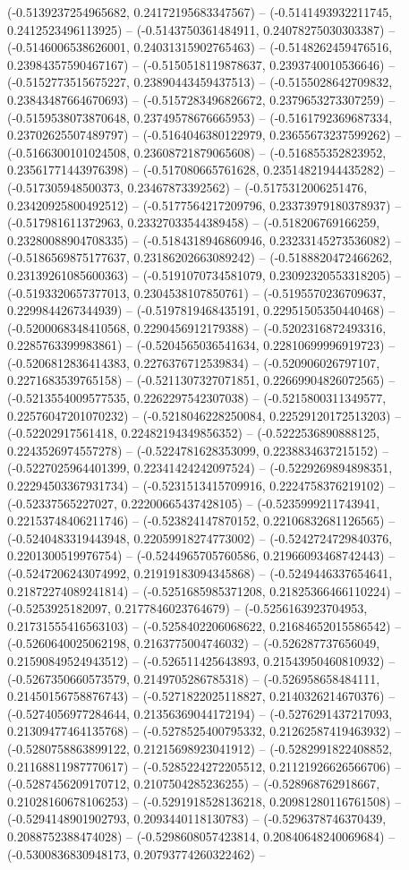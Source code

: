 (-0.5139237254965682, 0.24172195683347567) -- (-0.5141493932211745, 0.2412523496113925) -- (-0.5143750361484911, 0.24078275030303387) -- (-0.5146006538626001, 0.24031315902765463) -- (-0.5148262459476516, 0.23984357590467167) -- (-0.5150518119878637, 0.2393740010536646) -- (-0.5152773515675227, 0.23890443459437513) -- (-0.5155028642709832, 0.23843487664670693) -- (-0.5157283496826672, 0.2379653273307259) -- (-0.5159538073870648, 0.23749578676665953) -- (-0.5161792369687334, 0.23702625507489797) -- (-0.5164046380122979, 0.23655673237599262) -- (-0.5166300101024508, 0.23608721879065608) -- (-0.516855352823952, 0.23561771443976398) -- (-0.517080665761628, 0.23514821944435282) -- (-0.517305948500373, 0.23467873392562) -- (-0.5175312006251476, 0.23420925800492512) -- (-0.5177564217209796, 0.23373979180378937) -- (-0.517981611372963, 0.23327033544389458) -- (-0.518206769166259, 0.23280088904708335) -- (-0.5184318946860946, 0.23233145273536082) -- (-0.5186569875177637, 0.23186202663089242) -- (-0.5188820472466262, 0.23139261085600363) -- (-0.5191070734581079, 0.23092320553318205) -- (-0.5193320657377013, 0.2304538107850761) -- (-0.5195570236709637, 0.2299844267344939) -- (-0.5197819468435191, 0.22951505350440468) -- (-0.5200068348410568, 0.2290456912179388) -- (-0.5202316872493316, 0.2285763399983861) -- (-0.5204565036541634, 0.22810699996919723) -- (-0.5206812836414383, 0.2276376712539834) -- (-0.520906026797107, 0.2271683539765158) -- (-0.5211307327071851, 0.22669904826072565) -- (-0.5213554009577535, 0.2262297542307038) -- (-0.5215800311349577, 0.22576047201070232) -- (-0.5218046228250084, 0.22529120172513203) -- (-0.52202917561418, 0.22482194349856352) -- (-0.5222536890888125, 0.2243526974557278) -- (-0.5224781628353099, 0.2238834637215152) -- (-0.5227025964401399, 0.22341424242097524) -- (-0.5229269894898351, 0.22294503367931734) -- (-0.5231513415709916, 0.2224758376219102) -- (-0.52337565227027, 0.22200665437428105) -- (-0.5235999211743941, 0.22153748406211746) -- (-0.523824147870152, 0.22106832681126565) -- (-0.5240483319443948, 0.22059918274773002) -- (-0.5242724729840376, 0.2201300519976754) -- (-0.5244965705760586, 0.21966093468742443) -- (-0.5247206243074992, 0.21919183094345868) -- (-0.5249446337654641, 0.21872274089241814) -- (-0.5251685985371208, 0.21825366466110224) -- (-0.5253925182097, 0.2177846023764679) -- (-0.5256163923704953, 0.21731555416563103) -- (-0.5258402206068622, 0.21684652015586542) -- (-0.5260640025062198, 0.2163775004746032) -- (-0.526287737656049, 0.21590849524943512) -- (-0.526511425643893, 0.21543950460810932) -- (-0.5267350660573579, 0.2149705286785318) -- (-0.526958658484111, 0.21450156758876743) -- (-0.5271822025118827, 0.2140326214670376) -- (-0.5274056977284644, 0.21356369044172194) -- (-0.5276291437217093, 0.21309477464135768) -- (-0.5278525400795332, 0.21262587419463932) -- (-0.5280758863899122, 0.21215698923041912) -- (-0.5282991822408852, 0.21168811987770617) -- (-0.5285224272205512, 0.21121926626566706) -- (-0.5287456209170712, 0.2107504285236255) -- (-0.528968762918667, 0.21028160678106253) -- (-0.5291918528136218, 0.20981280116761508) -- (-0.5294148901902793, 0.2093440118130783) -- (-0.5296378746370439, 0.2088752388474028) -- (-0.5298608057423814, 0.20840648240069684) -- (-0.5300836830948173, 0.20793774260322462) -- 
